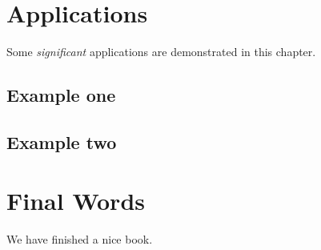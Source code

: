 \documentclass[oneside, a4paper]{memoir}
\theoremstyle{definition}
\theoremstyle{definition}
\theoremstyle{definition}
\theoremstyle{remark}
\begin{document}
\chapter{Applications}\label{applications}

Some \emph{significant} applications are demonstrated in this chapter.

\section{Example one}\label{example-one}

\section{Example two}\label{example-two}

\chapter{Final Words}\label{final-words}

We have finished a nice book.


\end{document}
